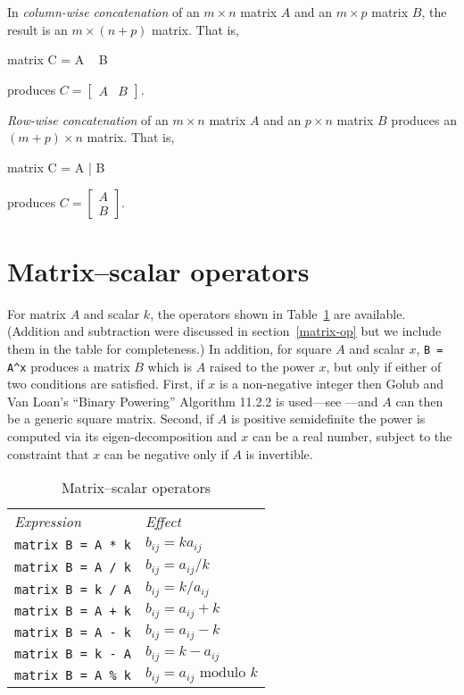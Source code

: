 In \textit{column-wise concatenation} of an $m\times n$ matrix $A$ and
an $m\times p$ matrix $B$, the result is an $m\times (n+p)$ matrix.
That is,
%
\begin{code}
matrix C = A ~ B
\end{code}
% 
produces $C = \left[ \begin{array}{cc} A & B \end{array} \right]$.

\textit{Row-wise concatenation} of an $m\times n$ matrix $A$ and
an $p\times n$ matrix $B$ produces an $(m+p) \times n$ matrix.
That is,
%
\begin{code}
matrix C = A | B
\end{code}
% 
produces $C = \left[ \begin{array}{cc} A \\ B \end{array} \right]$.

\section{Matrix--scalar operators}
\label{matrix-scalar-op}

For matrix $A$ and scalar $k$, the operators shown in
Table~\ref{tab:matrix-scalar-ops} are available.  (Addition and
subtraction were discussed in section~\ref{matrix-op} but we include
them in the table for completeness.)  In addition, for square $A$ and
scalar $x$, \verb|B = A^x| produces a matrix $B$ which is $A$ raised
to the power $x$, but only if either of two conditions are
satisfied. First, if $x$ is a non-negative integer then Golub and Van
Loan's ``Binary Powering'' Algorithm 11.2.2 is used---see
\cite{golub96}---and $A$ can then be a generic square matrix. Second,
if $A$ is positive semidefinite the power is computed via its
eigen-decomposition and $x$ can be a real number, subject to the
constraint that $x$ can be negative only if $A$ is invertible.

\begin{table}[htbp]
\centering
\begin{tabular}{ll}
\textit{Expression} & \textit{Effect} \\[4pt]
\texttt{matrix B = A * k} & $b_{ij} = k a_{ij}$ \\
\texttt{matrix B = A / k} & $b_{ij} = a_{ij} / k$ \\
\texttt{matrix B = k / A} & $b_{ij} = k / a_{ij}$ \\
\texttt{matrix B = A + k} & $b_{ij} = a_{ij} + k$ \\
\texttt{matrix B = A - k} & $b_{ij} = a_{ij} - k$ \\
\texttt{matrix B = k - A} & $b_{ij} = k - a_{ij}$ \\
\texttt{matrix B = A \% k} & $b_{ij} = a_{ij} \mbox{ modulo } k$ \\
\end{tabular}
\caption{Matrix--scalar operators}
\label{tab:matrix-scalar-ops}
\end{table}



